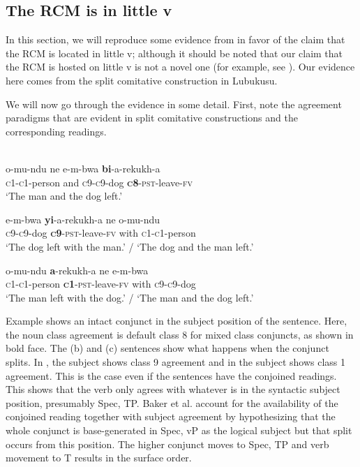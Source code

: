 \documentclass[output=paper]{langsci/langscibook}
\begin{document}
 
\subsection{ The RCM is in little v}


In this section, we will reproduce some evidence from \citet{BakerEtAl2013} in favor of the claim that the RCM is located in little v; although it should be noted that our claim that the RCM is hosted on little v is not a novel one (for example, see \citealt{Bruening2006}). Our evidence here comes from the split comitative construction in Lubukusu. 

  We will now go through the evidence in some detail. First, note the agreement paradigms that are evident in split comitative constructions and the corresponding readings. 



\ea\label{ex:}
\\
\ea
\gll   o-mu-ndu        ne   e-m-bwa  \textbf{{bi}}{-a-rekukh-a} \\
       \textsc{c1-c1}-person   and  \textsc{c9-c9}-dog   \textbf{\textsc{c}}\textbf{8}-\textsc{pst}-leave-\textsc{fv} \\
\glt   ‘The man and the dog left.’

\ex
\gll   e-m-bwa  \textbf{{yi}}-a-rekukh-a     ne   o-mu-ndu\\
       \textsc{c9-c9}-dog  \textbf{\textsc{c}}\textbf{9}-\textsc{pst}-leave-\textsc{fv}   with   \textsc{c1-c1}-person\\
\glt   ‘The dog left with the man.’ / ‘The dog and the man left.’

\ex
\gll   o-mu-ndu   \textbf{a}-rekukh-a     ne   e-m-bwa\\
       \textsc{c1-c1}-person   \textbf{\textsc{c}}\textbf{1}-\textsc{pst}-leave-\textsc{fv}   with   \textsc{c9-c9}-dog\\
\glt   ‘The man left with the dog.’ / ‘The man and the dog left.’
\z
\z

Example  shows an intact conjunct in the subject position of the sentence. Here, the noun class agreement is default class 8 for mixed class conjuncts, as shown in bold face. The (b) and (c) sentences show what happens when the conjunct splits. In , the subject shows class 9 agreement and in  the subject shows class 1 agreement. This is the case even if the sentences have the conjoined readings. This shows that the verb only agrees with whatever is in the syntactic subject position, presumably Spec, TP. Baker et al. account for the availability of the conjoined reading together with subject agreement by hypothesizing that the whole conjunct is base-generated in Spec, vP as the logical subject but that split occurs from this position. The higher conjunct moves to Spec, TP and verb movement to T results in the surface order.  
\end{document}
